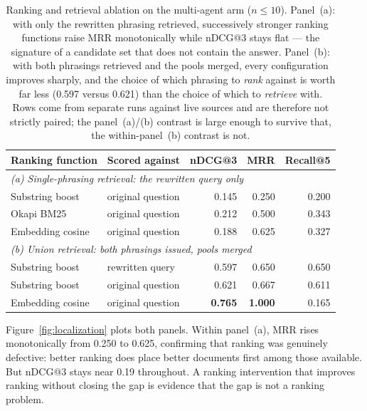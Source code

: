 \documentclass[acmsmall,review,anonymous,screen]{acmart}
\begin{document}
\begin{table}[t]
\caption{Ranking and retrieval ablation on the multi-agent arm ($n \le 10$).
Panel~(a): with only the rewritten phrasing retrieved, successively stronger
ranking functions raise MRR monotonically while nDCG@3 stays flat --- the
signature of a candidate set that does not contain the answer. Panel~(b): with
both phrasings retrieved and the pools merged, every configuration improves
sharply, and the choice of which phrasing to \emph{rank} against is worth far
less (0.597 versus 0.621) than the choice of which to \emph{retrieve} with.
Rows come from separate runs against live sources and are therefore not strictly
paired; the panel~(a)/(b) contrast is large enough to survive that, the
within-panel~(b) contrast is not.}
\label{tab:ranking-ablation}
\begin{tabular}{llrrr}
\toprule
Ranking function & Scored against & nDCG@3 & MRR & Recall@5 \\
\midrule
\multicolumn{5}{l}{\emph{(a) Single-phrasing retrieval: the rewritten query only}} \\
Substring boost & original question & 0.145 & 0.250 & 0.200 \\
Okapi BM25      & original question & 0.212 & 0.500 & 0.343 \\
Embedding cosine & original question & 0.188 & 0.625 & 0.327 \\
\midrule
\multicolumn{5}{l}{\emph{(b) Union retrieval: both phrasings issued, pools merged}} \\
Substring boost & rewritten query  & 0.597 & 0.650 & 0.650 \\
Substring boost & original question & 0.621 & 0.667 & 0.611 \\
Embedding cosine & original question & \textbf{0.765} & \textbf{1.000} & 0.165 \\
\bottomrule
\end{tabular}
\end{table}

Figure~\ref{fig:localization} plots both panels. Within panel~(a), MRR rises
monotonically from 0.250 to 0.625, confirming that
ranking was genuinely defective: better ranking does place better documents
first among those available. But nDCG@3 stays near 0.19 throughout. A ranking
intervention that improves ranking without closing the gap is evidence that the
gap is not a ranking problem.
\end{document}
